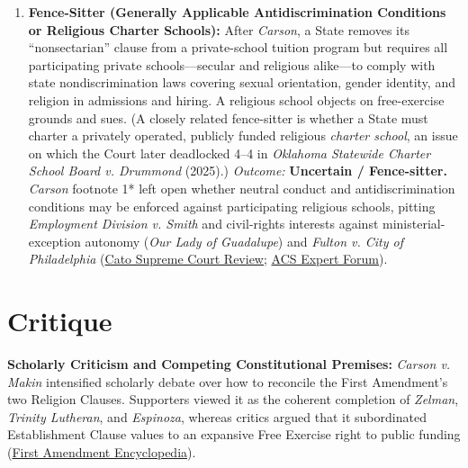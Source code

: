 \documentclass[12pt]{article}
\begin{document}
\begin{enumerate}
  \item \textbf{Fence-Sitter (Generally Applicable Antidiscrimination Conditions or Religious Charter Schools):} After \textit{Carson}, a State removes its ``nonsectarian'' clause from a private-school tuition program but requires all participating private schools---secular and religious alike---to comply with state nondiscrimination laws covering sexual orientation, gender identity, and religion in admissions and hiring. A religious school objects on free-exercise grounds and sues. (A closely related fence-sitter is whether a State must charter a privately operated, publicly funded religious \textit{charter school}, an issue on which the Court later deadlocked 4--4 in \textit{Oklahoma Statewide Charter School Board v. Drummond} (2025).) \textit{Outcome:} \textbf{Uncertain / Fence-sitter.} \textit{Carson} footnote 1* left open whether neutral conduct and antidiscrimination conditions may be enforced against participating religious schools, pitting \textit{Employment Division v. Smith} and civil-rights interests against ministerial-exception autonomy (\textit{Our Lady of Guadalupe}) and \textit{Fulton v. City of Philadelphia} (\href{https://www.cato.org/supreme-court-review/2021-2022/use-nondistinction}{Cato Supreme Court Review}; \href{https://www.acslaw.org/expertforum/carson-v-makin-and-the-dwindling-twilight-of-the-establishment-clause/}{ACS Expert Forum}).
\end{enumerate}

\section{Critique}

\textbf{Scholarly Criticism and Competing Constitutional Premises:} \textit{Carson v. Makin} intensified scholarly debate over how to reconcile the First Amendment's two Religion Clauses. Supporters viewed it as the coherent completion of \textit{Zelman}, \textit{Trinity Lutheran}, and \textit{Espinoza}, whereas critics argued that it subordinated Establishment Clause values to an expansive Free Exercise right to public funding (\href{https://firstamendment.mtsu.edu/article/carson-v-makin/}{First Amendment Encyclopedia}).
\end{document}
